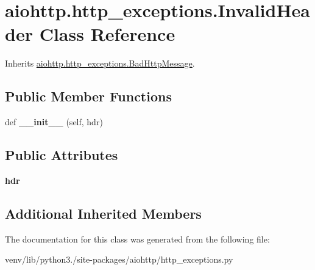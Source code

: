 \hypertarget{classaiohttp_1_1http__exceptions_1_1_invalid_header}{}\section{aiohttp.\+http\+\_\+exceptions.\+Invalid\+Header Class Reference}
\label{classaiohttp_1_1http__exceptions_1_1_invalid_header}


Inherits \hyperlink{classaiohttp_1_1http__exceptions_1_1_bad_http_message}{aiohttp.\+http\+\_\+exceptions.\+Bad\+Http\+Message}.

\subsection*{Public Member Functions}
\begin{DoxyCompactItemize}
\item 
\mbox{\label{classaiohttp_1_1http__exceptions_1_1_invalid_header_a511b805a1652ee3e6eafe0423dc93895}} 
def {\bfseries \+\_\+\+\_\+init\+\_\+\+\_\+} (self, hdr)
\end{DoxyCompactItemize}
\subsection*{Public Attributes}
\begin{DoxyCompactItemize}
\item 
\mbox{\label{classaiohttp_1_1http__exceptions_1_1_invalid_header_af1875a9b532bfc9dadc46830a170c301}} 
{\bfseries hdr}
\end{DoxyCompactItemize}
\subsection*{Additional Inherited Members}


The documentation for this class was generated from the following file\+:\begin{DoxyCompactItemize}
\item 
venv/lib/python3./site-\/packages/aiohttp/http\+\_\+exceptions.\+py\end{DoxyCompactItemize}
